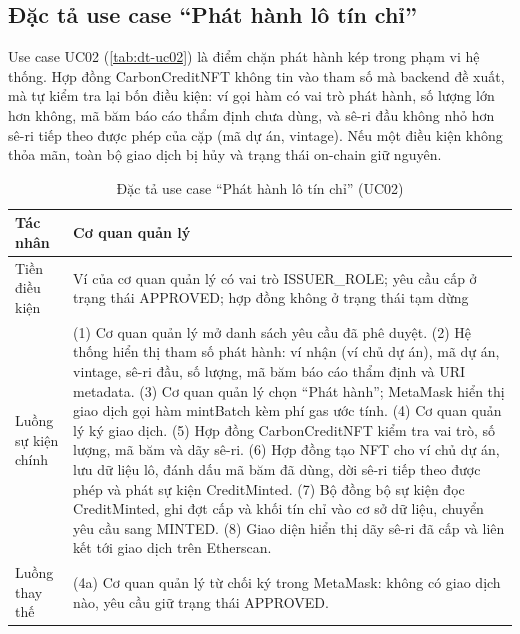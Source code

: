 \subsection*{Đặc tả use case ``Phát hành lô tín chỉ''}
\label{subsec:dt-uc02}

Use case UC02 (\autoref{tab:dt-uc02}) là điểm chặn phát hành kép trong phạm vi hệ thống. Hợp đồng CarbonCreditNFT không tin vào tham số mà backend đề xuất, mà tự kiểm tra lại bốn điều kiện: ví gọi hàm có vai trò phát hành, số lượng lớn hơn không, mã băm báo cáo thẩm định chưa dùng, và sê-ri đầu không nhỏ hơn sê-ri tiếp theo được phép của cặp (mã dự án, vintage). Nếu một điều kiện không thỏa mãn, toàn bộ giao dịch bị hủy và trạng thái on-chain giữ nguyên.

\begin{table}[!htbp]
    \centering
    \caption{Đặc tả use case ``Phát hành lô tín chỉ'' (UC02)}
    \label{tab:dt-uc02}
    \small
    \begin{tabularx}{\textwidth}{|L{2.8cm}|Y|}
        \hline
        Tác nhân & Cơ quan quản lý \\
        \hline
        Tiền điều kiện & Ví của cơ quan quản lý có vai trò ISSUER\_ROLE; yêu cầu cấp ở trạng thái APPROVED; hợp đồng không ở trạng thái tạm dừng \\
        \hline
        Luồng sự kiện chính & (1) Cơ quan quản lý mở danh sách yêu cầu đã phê duyệt.\newline
        (2) Hệ thống hiển thị tham số phát hành: ví nhận (ví chủ dự án), mã dự án, vintage, sê-ri đầu, số lượng, mã băm báo cáo thẩm định và URI metadata.\newline
        (3) Cơ quan quản lý chọn ``Phát hành''; MetaMask hiển thị giao dịch gọi hàm mintBatch kèm phí gas ước tính.\newline
        (4) Cơ quan quản lý ký giao dịch.\newline
        (5) Hợp đồng CarbonCreditNFT kiểm tra vai trò, số lượng, mã băm và dãy sê-ri.\newline
        (6) Hợp đồng tạo NFT cho ví chủ dự án, lưu dữ liệu lô, đánh dấu mã băm đã dùng, dời sê-ri tiếp theo được phép và phát sự kiện CreditMinted.\newline
        (7) Bộ đồng bộ sự kiện đọc CreditMinted, ghi đợt cấp và khối tín chỉ vào cơ sở dữ liệu, chuyển yêu cầu sang MINTED.\newline
        (8) Giao diện hiển thị dãy sê-ri đã cấp và liên kết tới giao dịch trên Etherscan. \\
        \hline
        Luồng thay thế & (4a) Cơ quan quản lý từ chối ký trong MetaMask: không có giao dịch nào, yêu cầu giữ trạng thái APPROVED.\newline

\end{tabularx}
\end{table}
